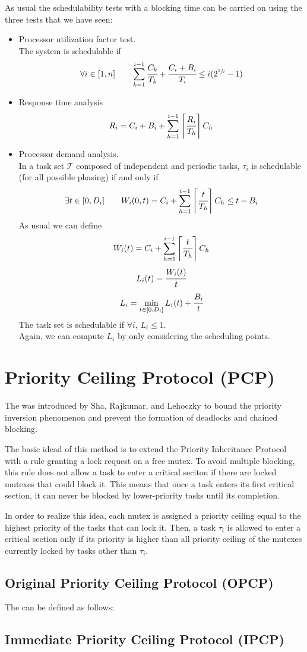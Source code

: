 As usual the schedulability tests with a blocking time can be carried on using the three tests that we have seen:
\begin{itemize}
    \item Processor utilization factor test.\\
    The system is schedulable if
    \[\forall i \in [1,n]\qquad \sum_{k=1}^{i-1}\cfrac{C_k}{T_k} + \cfrac{C_i + B_i}{T_i} \le i(2^{\sfrac{1}{i}} - 1)\]
    \item Response time analysis
    \[R_i = C_i + B_i + \sum_{h=1}^{i-1}\left\lceil \cfrac{R_i}{T_h} \right\rceil C_h\]
    \item Processor demand analysis.\\
    In a task set $\mathcal{T}$ composed of independent and periodic tasks, $\tau_i$ is schedulable (for all possible phasing) if and only if
    \[\exists t\in [0,D_i]\qquad W_i(0,t) = C_i + \sum_{h=1}^{i-1} \left\lceil \cfrac{t}{T_h} \right\rceil C_h \le t-B_i\]
    As usual we can define
    \[W_i(t) =C_i + \sum_{h=1}^{i-1} \left\lceil \cfrac{t}{T_h} \right\rceil C_h\]
    \[L_i(t) = \cfrac{W_i(t)}{t}\]
    \[L_i = \min_{t\in [0,D_i]}L_i(t) + \cfrac{B_i}{t}\]
    The task set is schedulable if $\forall i$, $L_i\le 1$.\\
    Again, we can compute $L_i$ by only considering the scheduling points.
\end{itemize}

\section{Priority Ceiling Protocol (PCP)} %
The  was introduced by Sha, Rajkumar, and Lehoczky to bound the priority inversion phenomenon and prevent the formation of deadlocks and chained blocking.

The basic idead of this method is to extend the Priority Inheritance Protocol with a rule granting a lock request on a free mutex. To avoid multiple blocking, this rule does not allow a task to enter a critical seciton if there are locked mutexes that could block it. This means that once a task enters its first critical section, it can never be blocked by lower-priority tasks until its completion.

In order to realize this idea, each mutex is assigned a priority ceiling equal to the highest priority of the tasks that can lock it. Then, a task $\tau_i$ is allowed to enter a critical section only if its priority is higher than all priority ceiling of the mutexes currently locked by tasks other than $\tau_i$.
\subsection{Original Priority Ceiling Protocol (OPCP)}

The  can be defined as follows:

\subsection{Immediate Priority Ceiling Protocol (IPCP)}